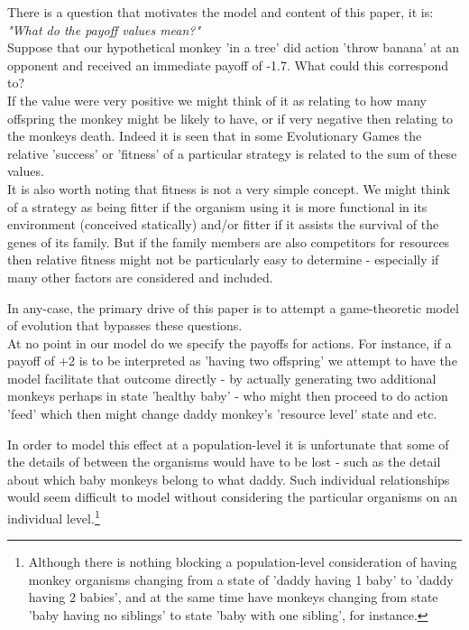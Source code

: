 There is a question that motivates the model and content of this paper, it is:\\ \textit{"What do the payoff values mean?"}\\
Suppose that our hypothetical monkey 'in a tree' did action 'throw banana' at an opponent and received an immediate payoff of -1.7.  What could this correspond to?\\
If the value were very positive we might think of it as relating to how many offspring the monkey might be likely to have, or if very negative then relating to the monkeys death.
Indeed it is seen that in some Evolutionary Games the relative 'success' or 'fitness' of a particular strategy is related to the sum of these values.\\
It is also worth noting that fitness is not a very simple concept\cite{sep-fitness}. We might think of a strategy as being fitter if the organism using it is more functional in its environment (conceived statically) and/or fitter if it assists the survival of the genes of its family. But if the family members are also competitors for resources then relative fitness might not be particularly easy to determine - especially if many other factors are considered and included.

In any-case, the primary drive of this paper is to attempt a game-theoretic model of evolution that bypasses these questions.\\
At no point in our model do we specify the payoffs for actions. For instance, if a payoff of +2 is to be interpreted as 'having two offspring' we attempt to have the model facilitate that outcome directly - by actually generating two additional monkeys perhaps in state 'healthy baby' - who might then proceed to do action 'feed' which then might change daddy monkey's 'resource level' state and etc.

In order to model this effect at a population-level it is unfortunate that some of the details of between the organisms would have to be lost - such as the detail about which baby monkeys belong to what daddy. Such individual relationships would seem difficult to model without considering the particular organisms on an individual level.\footnote{Although there is nothing blocking a population-level consideration of having monkey organisms changing from a state of 'daddy having 1 baby' to 'daddy having 2 babies', and at the same time have monkeys changing from state 'baby having no siblings' to state 'baby with one sibling', for instance.}

